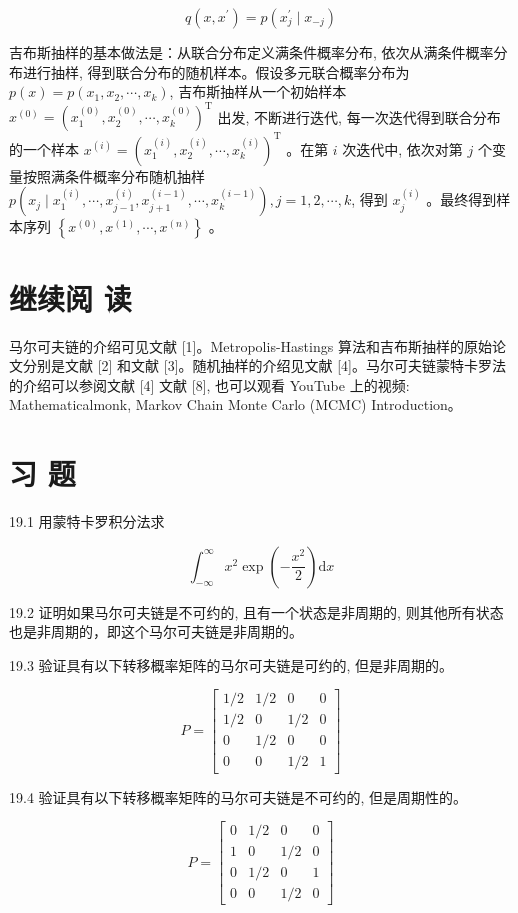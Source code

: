 \documentclass[10pt]{article}
\begin{document}
\begin{CJK*}{UTF8}{bsmi}
\begin{enumerate}
\end{enumerate}

$$
q\left(x, x^{\prime}\right)=p\left(x_{j}^{\prime} \mid x_{-j}\right)
$$

吉布斯抽样的基本做法是：从联合分布定义满条件概率分布, 依次从满条件概率分布进行抽样, 得到联合分布的随机样本。假设多元联合概率分布为 $p(x)=p\left(x_{1}, x_{2}, \cdots, x_{k}\right)$, 吉布斯抽样从一个初始样本 $x^{(0)}=\left(x_{1}^{(0)}, x_{2}^{(0)}, \cdots, x_{k}^{(0)}\right)^{\mathrm{T}}$ 出发, 不断进行迭代, 每一次迭代得到联合分布的一个样本 $x^{(i)}=\left(x_{1}^{(i)}, x_{2}^{(i)}, \cdots, x_{k}^{(i)}\right)^{\mathrm{T}}$ 。在第 $i$ 次迭代中, 依次对第 $j$ 个变量按照满条件概率分布随机抽样 $p\left(x_{j} \mid x_{1}^{(i)}, \cdots, x_{j-1}^{(i)}, x_{j+1}^{(i-1)}, \cdots, x_{k}^{(i-1)}\right), j=1,2, \cdots, k$, 得到 $x_{j}^{(i)}$ 。最终得到样本序列 $\left\{x^{(0)}, x^{(1)}, \cdots, x^{(n)}\right\}$ 。

\section*{继续阅 读}
马尔可夫链的介绍可见文献 [1]。Metropolis-Hastings 算法和吉布斯抽样的原始论文分别是文献 [2] 和文献 [3]。随机抽样的介绍见文献 [4]。马尔可夫链蒙特卡罗法的介绍可以参阅文献 [4] 文献 [8], 也可以观看 YouTube 上的视频: Mathematicalmonk, Markov Chain Monte Carlo (MCMC) Introduction。

\section*{习 题}
19.1 用蒙特卡罗积分法求

$$
\int_{-\infty}^{\infty} x^{2} \exp \left(-\frac{x^{2}}{2}\right) \mathrm{d} x
$$

19.2 证明如果马尔可夫链是不可约的, 且有一个状态是非周期的, 则其他所有状态也是非周期的，即这个马尔可夫链是非周期的。

19.3 验证具有以下转移概率矩阵的马尔可夫链是可约的, 但是非周期的。

$$
P=\left[\begin{array}{cccc}
1 / 2 & 1 / 2 & 0 & 0 \\
1 / 2 & 0 & 1 / 2 & 0 \\
0 & 1 / 2 & 0 & 0 \\
0 & 0 & 1 / 2 & 1
\end{array}\right]
$$

19.4 验证具有以下转移概率矩阵的马尔可夫链是不可约的, 但是周期性的。

$$
P=\left[\begin{array}{cccc}
0 & 1 / 2 & 0 & 0 \\
1 & 0 & 1 / 2 & 0 \\
0 & 1 / 2 & 0 & 1 \\
0 & 0 & 1 / 2 & 0
\end{array}\right]
$$


\end{CJK*}
\end{document}
